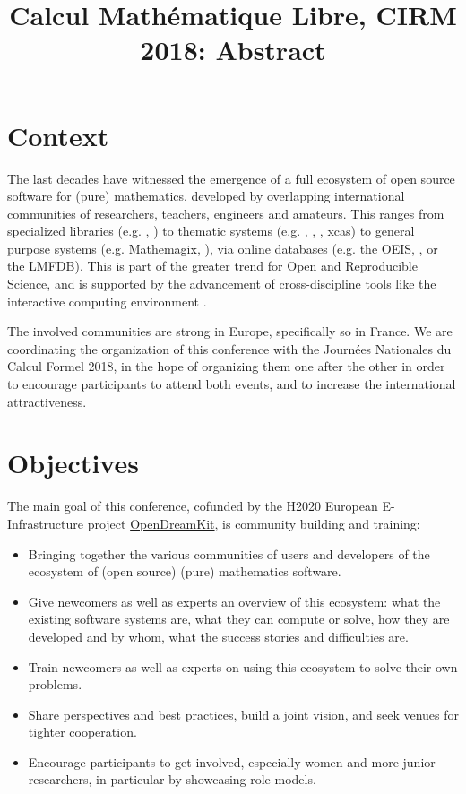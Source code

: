 \documentclass[12pt]{amsart}
\begin{document}
\title{Calcul Mathématique Libre, CIRM 2018: Abstract}
\maketitle
\thispagestyle{empty}

\section*{Context}

The last decades have witnessed the emergence of a full ecosystem of
open source software for (pure) mathematics, developed by overlapping
international communities of researchers, teachers, engineers and
amateurs. This ranges from specialized libraries (e.g. \MPIR, \Linbox)
to thematic systems (e.g. \GAP, \Pari, \Singular, xcas) to general
purpose systems (e.g. Mathemagix, \Sage), via online databases
(e.g. the OEIS, \MathHub, or the LMFDB). This is part of the greater
trend for Open and Reproducible Science, and is supported by the
advancement of cross-discipline tools like the interactive computing
environment \Jupyter.

The involved communities are strong in Europe, specifically so in
France. We are coordinating the organization of this conference with the Journées
Nationales du Calcul Formel 2018, in the hope of organizing them one
after the other in order to encourage participants to attend both
events, and to increase the international attractiveness.

\section*{Objectives}

The main goal of this conference, cofunded by the H2020 European
E-Infrastructure project \href{opendreamkit.org}{OpenDreamKit}, is
community building and training:
\begin{itemize}
\item Bringing together the various communities of users and
  developers of the ecosystem of (open source) (pure) mathematics
  software.
\item Give newcomers as well as experts an overview of this ecosystem:
  what the existing software systems are, what they can compute or solve, how
  they are developed and by whom, what the success stories and
  difficulties are.
\item Train newcomers as well as experts on using this ecosystem to
  solve their own problems.
\item Share perspectives and best practices, build a joint vision, and
  seek venues for tighter cooperation.
\item Encourage participants to get involved, especially
  women and more junior researchers, in particular by showcasing role models.
\end{itemize}
\end{document}
